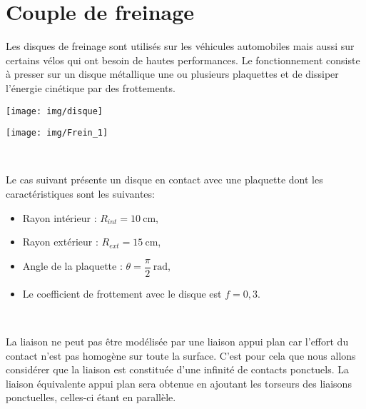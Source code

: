 
\usepackage[locale=FR]{siunitx}

  \textheight 250mm
  \pagestyle{fancy}
  \fancyfoot[C]{\thepage}

  \linespread{1.5}
  


  \begin{center}
  \end{center}


\section{Couple de freinage}

Les disques de freinage sont utilisés sur les véhicules automobiles mais aussi sur certains vélos qui ont besoin de hautes performances. Le fonctionnement consiste à presser sur un disque métallique une ou plusieurs plaquettes et de dissiper l'énergie cinétique par des frottements.

\begin{minipage}{0.47\linewidth}
 \centering\texttt{[image: img/disque]}
\end{minipage}\hfill
\begin{minipage}{0.47\linewidth}
 \centering\texttt{[image: img/Frein\_1]}
\end{minipage}

~\

Le cas suivant présente un disque en contact avec une plaquette dont les caractéristiques sont les suivantes:
\begin{itemize}
 \item Rayon intérieur : $R_{int}=\SI{10}{\centi\meter}$,
 \item Rayon extérieur : $R_{ext}=\SI{15}{\centi\meter}$,
 \item Angle de la plaquette : $\theta=\dfrac{\pi}{2}\ \mathrm{rad}$,
 \item Le coefficient de frottement avec le disque est $f=0,3$.
\end{itemize}

~\

La liaison ne peut pas être modélisée par une liaison appui plan car l'effort du contact n'est pas homogène sur toute la surface. C'est pour cela que nous allons considérer que la liaison est constituée d'une infinité de contacts ponctuels. La liaison équivalente appui plan sera obtenue en ajoutant les torseurs des liaisons ponctuelles, celles-ci étant en parallèle.


